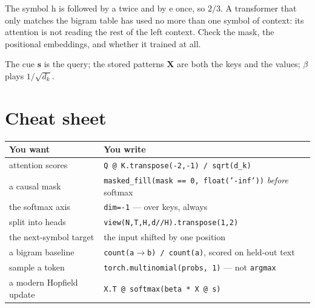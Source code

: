 \documentclass[11pt]{article}
\begin{document}
 The symbol h is followed by a twice and by e once, so $2/3$. A
transformer that only matches the bigram table has used no more than one symbol
of context: its attention is not reading the rest of the left context. Check the
mask, the positional embeddings, and whether it trained at all.

 The cue $\boldsymbol{s}$ is the query; the stored patterns
$\boldsymbol{X}$ are both the keys and the values; $\beta$ plays $1/\sqrt{d_k}$.

\section*{Cheat sheet}

\begin{center}
\begin{tabular}{@{}p{}p{}@{}}
\toprule
\textbf{You want} & \textbf{You write} \\
\midrule
attention scores          & \texttt{Q @ K.transpose(-2,-1) / sqrt(d\_k)} \\
a causal mask             & \texttt{masked\_fill(mask == 0, float('-inf'))} \emph{before} softmax \\
the softmax axis          & \texttt{dim=-1} --- over keys, always \\
split into heads          & \texttt{view(N,T,H,d//H).transpose(1,2)} \\
the next-symbol target    & the input shifted by one position \\
a bigram baseline         & \texttt{count(a$\to$b) / count(a)}, scored on held-out text \\
sample a token            & \texttt{torch.multinomial(probs, 1)} --- not \texttt{argmax} \\
a modern Hopfield update  & \texttt{X.T @ softmax(beta * X @ s)} \\
\bottomrule
\end{tabular}
\end{center}
\end{document}
